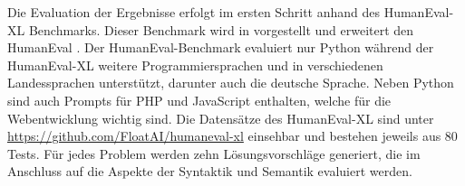 Die Evaluation der Ergebnisse erfolgt im ersten Schritt anhand des HumanEval-XL Benchmarks. Dieser Benchmark wird in \cite{peng-2024} vorgestellt und erweitert den HumanEval \cite{chen-2021}. Der HumanEval-Benchmark evaluiert nur Python während der HumanEval-XL weitere Programmiersprachen und in verschiedenen Landessprachen unterstützt, darunter auch die deutsche Sprache. Neben Python sind auch Prompts für PHP und JavaScript enthalten, welche für die Webentwicklung wichtig sind. Die Datensätze des HumanEval-XL sind unter \href{https://github.com/FloatAI/humaneval-xl}{https://github.com/FloatAI/humaneval-xl} einsehbar und bestehen jeweils aus 80 Tests. Für jedes Problem werden zehn Lösungsvorschläge generiert, die im Anschluss auf die Aspekte der Syntaktik und Semantik evaluiert werden.\vspace{0.2cm}






